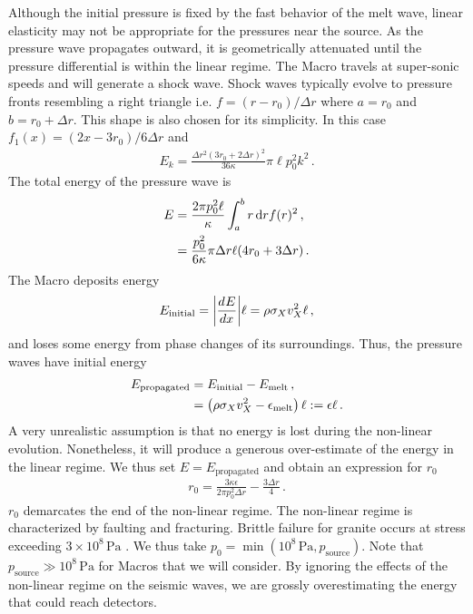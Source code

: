 \documentclass[prd,reprint,10pt]{revtex4-1}
\newcommand*\diff{\mathop{}\!\mathrm{d}}
\newcommand*\te[1]{\text{#1}}
\newcommand*\p[1]{\left(#1\right)}
\newcommand*\f[2]{\frac{#1}{#2}}
\newcommand*\td[3]{\frac{d^{#3}#1}{d #2^{#3}}}
\begin{document}
Although the initial pressure is fixed by the fast behavior of the melt wave, linear elasticity may not be appropriate for the pressures near the source. As the pressure wave propagates outward, it is geometrically attenuated until the pressure differential is within the linear regime. The Macro travels at super-sonic speeds and will generate a shock wave. Shock waves typically evolve to pressure fronts resembling a right triangle \cite{forbes2013shock} i.e. $f = \p{r - r_0}/\Delta r$ where $a = r_0$ and $b = r_0 + \Delta r$. This shape is also chosen for its simplicity. In this case $f_1(x) = \p{2 x-3r_0}/6\Delta r$ and
\begin{align}
E_k = \f{\Delta r^2(3r_0+2\Delta r)^2}{36 \kappa} \pi\ell p_0^2k^2\,.
\end{align}
The total energy of the pressure wave is
\begin{align}
E \notag&= \f{2\pi p_0^2\ell}{\kappa}\int_a^b r\diff r f(r)^2\,,\\
&=\f{p_0^2}{6\kappa}\pi\Delta r \ell(4r_0 + 3\Delta r)\,.
\end{align}
The Macro deposits energy
\begin{align}
E_\te{initial} = \abs{\td{E}{x}{}}\ell = \rho\sigma_X v_X^2\ell\,,
\end{align}
and loses some energy from phase changes of its surroundings. Thus, the pressure waves have initial energy
\begin{align}
E_\te{propagated} \notag&= E_\te{initial} - E_\te{melt}\,,\\
&= \p{\rho\sigma_X v_X^2 - \epsilon_\te{melt}}\ell:=\epsilon\ell\,.
\end{align}
A very unrealistic assumption is that no energy is lost during the non-linear evolution. Nonetheless, it will produce a generous over-estimate of the energy in the linear regime. We thus set $E = E_\te{propagated}$ and obtain an expression for $r_0$
\begin{align}
r_0 =  \f{3\kappa\epsilon}{2\pi p_0^2\Delta r}-\f{3\Delta r}{4}\,.
\end{align}
$r_0$ demarcates the end of the non-linear regime. The non-linear regime is characterized by faulting and fracturing. Brittle failure for granite occurs at stress exceeding $3\times 10^8\,\te{Pa}$ \cite{lockner200232}. We thus take $p_0 = \min\p{10^8\,\te{Pa},p_\te{source}}$. Note that $p_\te{source}\gg 10^8\,\te{Pa}$ for Macros that we will consider. By ignoring the effects of the non-linear regime on the seismic waves, we are grossly overestimating the energy that could reach detectors. 
\end{document}

